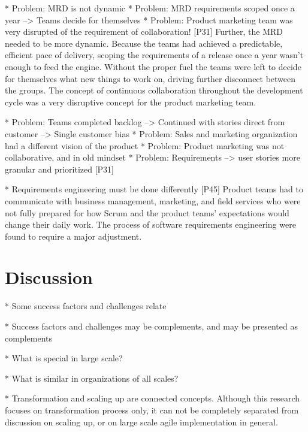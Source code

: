 \documentclass[preprint,authoryear,12pt]{elsarticle}
\begin{document}
* Problem: MRD is not dynamic
* Problem: MRD requirements scoped once a year --> Teams decide for themselves
* Problem: Product marketing team was very disrupted of the requirement of collaboration!
[P31]
Further, the MRD needed to be more dynamic. Because the teams had achieved a
predictable, efficient pace of delivery, scoping the requirements of a release
once a year wasn’t enough to feed the engine.  Without the proper fuel the teams
were left to decide for themselves what new things to work on, driving further
disconnect between the groups. The concept of continuous collaboration
throughout the development cycle was a very disruptive concept for the product
marketing team.

* Problem: Teams completed backlog --> Continued with stories direct from customer --> Single customer bias
* Problem: Sales and marketing organization had a different vision of the product
* Problem: Product marketing was not collaborative, and in old mindset
* Problem: Requirements --> user stories more granular and prioritized
[P31]

* Requirements engineering must be done differently
[P45]
Product teams had to communicate with business management, marketing, and field
services who were not fully prepared for how Scrum and the product teams’
expectations would change their daily work. The process of software requirements
engineering were found to require a major adjustment.









\section{Discussion}
\label{sec:discussion}

* Some success factors and challenges relate

* Success factors and challenges may be complements, and may be presented as
  complements

* What is special in large scale?

* What is similar in organizations of all scales?

* Transformation and scaling up are connected concepts. Although this research
  focuses on transformation process only, it can not be completely separated
  from discussion on scaling up, or on large scale agile implementation in
  general.
\end{document}
